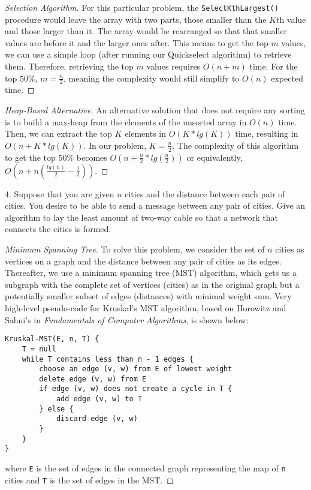 \documentclass{scrartcl}
\begin{document}
\begin{flushleft}
\begin{proof}[Selection Algorithm]
        For this particular problem, the \verb|SelectKthLargest()| procedure would leave the array
        with two parts, those smaller than the $K$th value and those larger than it. The array would
        be rearranged so that that smaller values are before it and the larger ones after. This
        means to get the top $m$ values, we can use a simple loop (after running our Quickselect
        algorithm) to retrieve them. Therefore, retrieving the top $m$ values requires $O(n + m)$
        time. For the top $50\%$, $m = \frac{n}{2}$, meaning the complexity would still simplify to
        $O(n)$ expected time.
    \end{proof}
    \medskip
    \begin{proof}[Heap-Based Alternative]\let\qed\relax
        An alternative solution that does not require any sorting is to build a max-heap from the
        elements of the unsorted array in $O(n)$ time. Then, we can extract the top $K$ elements in
        $O(K * lg(K))$ time, resulting in $O(n + K * lg(K))$. In our problem, $K = \frac{n}{2}$. The
        complexity of this algorithm to get the top $50\%$ becomes $O(n + \frac{n}{2} *
        lg(\frac{n}{2}))$ or equivalently, $ O(n + n (\frac{lg(n)}{2} - \frac{1}{2}))$.
    \end{proof}

    \newpage
    4. Suppose that you are given $n$ cities and the distance between each pair of cities. You
    desire to be able to send a message between any pair of cities. Give an algorithm to lay the
    least amount of two-way cable so that a network that connects the cities is formed.
    \begin{proof}[Minimum Spanning Tree]\let\qed\relax
        To solve this problem, we consider the set of $n$ cities as vertices on a graph and the
        distance between any pair of cities as its edges. Thereafter, we use a minimum spanning tree
        (MST) algorithm, which gets us a subgraph with the complete set of vertices (cities) as in
        the original graph but a potentially smaller subset of edges (distances) with minimal weight
        sum. Very high-level pseudo-code for Kruskal's MST algorithm, based on Horowitz and Sahni's
        in \textit{Fundamentals of Computer Algorithms}, is shown below:
        \medskip
\begin{verbatim}
Kruskal-MST(E, n, T) {
    T = null
    while T contains less than n - 1 edges {
        choose an edge (v, w) from E of lowest weight
        delete edge (v, w) from E
        if edge (v, w) does not create a cycle in T {
            add edge (v, w) to T
        } else {
            discard edge (v, w)
        }
    }
}
\end{verbatim}
        where \verb|E| is the set of edges in the connected graph representing the map of \verb|n|
        cities and \verb|T| is the set of edges in the MST.
        \bigskip


\end{proof}
\end{flushleft}
\end{document}
